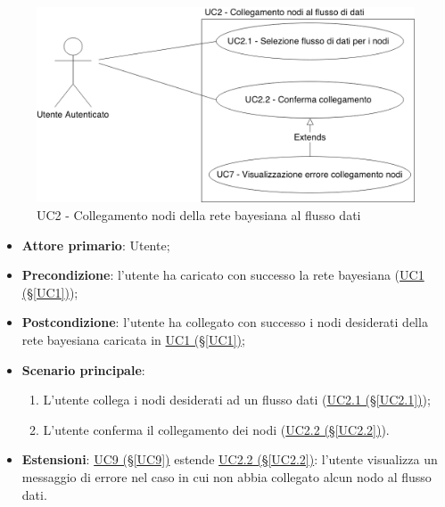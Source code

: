 \begin{figure}[H]
\centering
\includegraphics[scale=0.4]{./images/UC2.png}
\caption{UC2 - Collegamento nodi della rete bayesiana al flusso dati}
\end{figure}

\begin{itemize}
\item \textbf{Attore primario}: Utente;
\item \textbf{Precondizione}: l'utente ha caricato con successo la rete bayesiana (\hyperref[UC1]{UC1 (§\ref*{UC1})});
\item \textbf{Postcondizione}: l'utente ha collegato con successo i nodi desiderati della rete bayesiana caricata in \hyperref[UC1]{UC1 (§\ref*{UC1})};
\item \textbf{Scenario principale}:
	\begin{enumerate}
	\item L'utente collega i nodi desiderati ad un flusso dati (\hyperref[UC2.1]{UC2.1 (§\ref*{UC2.1})});
	\item L'utente conferma il collegamento dei nodi (\hyperref[UC2.2]{UC2.2 (§\ref*{UC2.2})}).
	\end{enumerate}
\item \textbf{Estensioni}: \hyperref[UC9]{UC9 (§\ref*{UC9})} estende \hyperref[UC2.2]{UC2.2 (§\ref*{UC2.2})}: l'utente visualizza un messaggio di errore nel caso in cui non abbia collegato alcun nodo al flusso dati.
\end{itemize}

